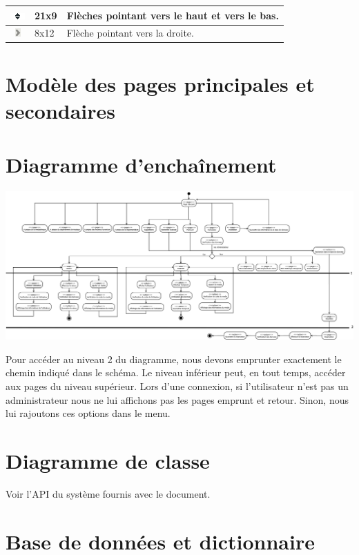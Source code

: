 \documentclass[letter, 11pt, draft]{report}
\begin{document}
\begin{table}[ht]
\begin{center}
\begin{tabular}{|c|l|l|}
		\includegraphics{upAndDown.png} 					& 21x9 				& Flèches pointant vers le haut et vers le bas. \\ \hline
		\includegraphics{img_puce_search.png} 				& 8x12 				& Flèche pointant vers la droite. \\ \hline
		\end{tabular}
	\end{center}
\end{table}

\section{Modèle des pages principales et secondaires}


\section{Diagramme d'enchaînement}
\includegraphics[scale=0.145]{diagrammeEnchainement.png}

Pour accéder au niveau 2 du diagramme, nous devons emprunter exactement le chemin indiqué dans le schéma. Le niveau inférieur peut, en tout temps, accéder aux pages du niveau supérieur.
Lors d'une connexion, si l'utilisateur n'est pas un administrateur nous ne lui affichons pas les pages emprunt et retour. Sinon, nous lui rajoutons ces options dans le menu.

\section{Diagramme de classe}

Voir l'API du système fournis avec le document.

\section{Base de données et dictionnaire}
\end{document}
